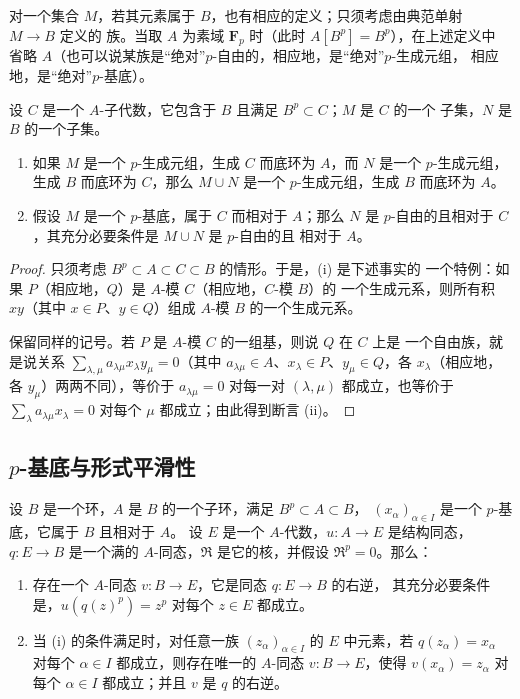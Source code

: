 对一个集合 $M$，若其元素属于 $B$，也有相应的定义；只须考虑由典范单射 $M\to B$ 定义的
族。当取 $A$ 为素域 $\mathbf F_p$ 时（此时 $A[B^p]=B^p$），在上述定义中
省略 $A$（也可以说某族是“绝对”$p$-自由的，相应地，是“绝对”$p$-生成元组，
相应地，是“绝对”$p$-基底）。

\begin{lemma}[21.1.10]
\label{0.21.1.10-fr}
设 $C$ 是一个 $A$-子代数，它包含于 $B$ 且满足 $B^p\subset C$；$M$ 是 $C$ 的一个
子集，$N$ 是 $B$ 的一个子集。
\begin{enumerate}
  \item[(i)] 如果 $M$ 是一个 $p$-生成元组，生成 $C$ 而底环为 $A$，而 $N$
  是一个 $p$-生成元组，生成 $B$ 而底环为 $C$，那么 $M\cup N$ 是一个
  $p$-生成元组，生成 $B$ 而底环为 $A$。
  \item[(ii)] 假设 $M$ 是一个 $p$-基底，属于 $C$ 而相对于 $A$；那么 $N$
  是 $p$-自由的且相对于 $C$，其充分必要条件是 $M\cup N$ 是 $p$-自由的且
  相对于 $A$。
\end{enumerate}
\end{lemma}

\begin{proof}
只须考虑 $B^p\subset A\subset C\subset B$ 的情形。于是，(i) 是下述事实的
一个特例：如果 $P$（相应地，$Q$）是 $A$-模 $C$（相应地，$C$-模 $B$）的
一个生成元系，则所有积 $xy$（其中 $x\in P$、$y\in Q$）组成 $A$-模 $B$
的一个生成元系。

保留同样的记号。若 $P$ 是 $A$-模 $C$ 的一组基，则说 $Q$ 在 $C$ 上是
一个自由族，就是说关系
$\sum_{\lambda,\mu}a_{\lambda\mu}x_\lambda y_\mu=0$（其中
$a_{\lambda\mu}\in A$、$x_\lambda\in P$、$y_\mu\in Q$，各
$x_\lambda$（相应地，各 $y_\mu$）两两不同），等价于
$a_{\lambda\mu}=0$ 对每一对 $(\lambda,\mu)$ 都成立，也等价于
$\sum_\lambda a_{\lambda\mu}x_\lambda=0$ 对每个 $\mu$ 都成立；由此得到断言 (ii)。
\end{proof}

\subsection{$p$-基底与形式平滑性}
\label{0.21.2-fr}

\begin{theorem}[21.2.1]
\label{0.21.2.1-fr}
设 $B$ 是一个环，$A$ 是 $B$ 的一个子环，满足 $B^p\subset A\subset B$，
$(x_\alpha)_{\alpha\in I}$ 是一个 $p$-基底，它属于 $B$ 且相对于 $A$。
设 $E$ 是一个 $A$-代数，$u:A\to E$ 是结构同态，$q:E\to B$ 是一个满的
$A$-同态，$\mathfrak R$ 是它的核，并假设 $\mathfrak R^p=0$。那么：
\begin{enumerate}
  \item[(i)] 存在一个 $A$-同态 $v:B\to E$，它是同态 $q:E\to B$ 的右逆，
  其充分必要条件是，$u(q(z)^p)=z^p$ 对每个 $z\in E$ 都成立。
  \item[(ii)] 当 (i) 的条件满足时，对任意一族
  $(z_\alpha)_{\alpha\in I}$ 的 $E$ 中元素，若 $q(z_\alpha)=x_\alpha$ 对每个
  $\alpha\in I$ 都成立，则存在唯一的 $A$-同态 $v:B\to E$，使得
  $v(x_\alpha)=z_\alpha$ 对每个 $\alpha\in I$ 都成立；并且 $v$ 是 $q$ 的右逆。
\end{enumerate}
\end{theorem}

